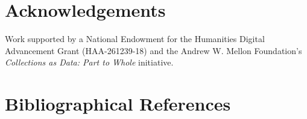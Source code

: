 \documentclass[10pt, a4paper]{article}
\begin{document}
\section{Acknowledgements}

Work supported by a National Endowment for the Humanities Digital Advancement
Grant (HAA-261239-18) and the Andrew W. Mellon Foundation's
\textit{Collections as Data: Part to Whole} initiative.

\nocite{*}
\section{Bibliographical References}\label{reference}




\end{document}
